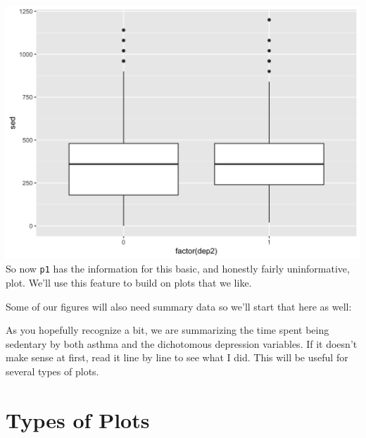 \documentclass[]{tufte-book}
\newenvironment{Shaded}{}{}
\newcommand{\KeywordTok}[1]{\textcolor[rgb]{0.00,0.44,0.13}{\textbf{#1}}}
\newcommand{\DataTypeTok}[1]{\textcolor[rgb]{0.56,0.13,0.00}{#1}}
\newcommand{\StringTok}[1]{\textcolor[rgb]{0.25,0.44,0.63}{#1}}
\newcommand{\OtherTok}[1]{\textcolor[rgb]{0.00,0.44,0.13}{#1}}
\newcommand{\OperatorTok}[1]{\textcolor[rgb]{0.40,0.40,0.40}{#1}}
\newcommand{\NormalTok}[1]{#1}
\theoremstyle{definition}
\theoremstyle{definition}
\theoremstyle{remark}
\begin{document}
\includegraphics{_main_files/figure-latex/unnamed-chunk-132-1} So now
\texttt{p1} has the information for this basic, and honestly fairly
uninformative, plot. We'll use this feature to build on plots that we
like.

Some of our figures will also need summary data so we'll start that here
as well:

\begin{Shaded}
\end{Shaded}

As you hopefully recognize a bit, we are summarizing the time spent
being sedentary by both asthma and the dichotomous depression variables.
If it doesn't make sense at first, read it line by line to see what I
did. This will be useful for several types of plots.

\section*{Types of Plots}\label{types-of-plots}
\end{document}
